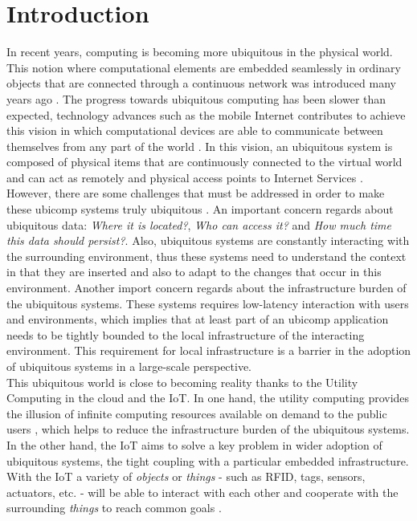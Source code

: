 
\chapter{Introduction}
\label{chapter:introduction}
In recent years, computing is becoming more ubiquitous in the physical world. This notion where
computational elements are embedded seamlessly in ordinary objects that are connected through a
continuous network was introduced many years ago \cite{weiser1991computer}. The progress
towards ubiquitous computing has been slower than expected, technology advances such as the mobile
Internet contributes to achieve this vision in which computational devices are able to communicate
between themselves from any part of the world \cite{gubbi2013internet}. In this vision, an ubiquitous
system is composed of physical items that are continuously connected to the virtual world and can act as
remotely and physical access points to Internet Services \cite{mattern2010internet}.\\

However, there are some challenges that must be addressed in order to make these \gls{ubicomp} systems
truly ubiquitous \cite{caceres2012ubicomp}. An important concern regards about ubiquitous data: \textit{Where it is located?},
\textit{Who can access it?} and \textit{How much time this data should persist?}. Also, ubiquitous systems
are constantly interacting with the surrounding environment, thus these systems need to understand
the context in that they are inserted and also to adapt to the changes that occur in this environment.
Another import concern regards about the infrastructure burden of the ubiquitous systems. These
systems requires low-latency interaction with users and environments, which implies that at least part
of an \gls{ubicomp} application needs to be tightly bounded to the local infrastructure of the interacting
environment. This requirement for local infrastructure is a barrier in the adoption of ubiquitous
systems in a large-scale perspective.\\

This ubiquitous world is close to becoming reality thanks to the Utility Computing in the cloud
and the \gls{IoT}. In one hand, the utility computing provides the illusion of infinite computing
resources available on demand to the public users \cite{armbrust2010view}, which helps to reduce the
infrastructure burden of the ubiquitous systems. In the other hand, the \gls{IoT} aims to solve a key
problem in wider adoption of ubiquitous systems, the tight coupling with a particular embedded
infrastructure. With the \gls{IoT} a variety of \textit{objects} or \textit{things} - such as \gls{RFID},
tags, sensors, actuators, etc. - will be able to interact with each other and cooperate with the
surrounding \textit{things} to reach common goals \cite{atzori2010internet}.\\

